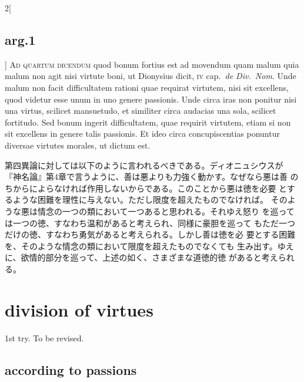 \documentclass[paper=a4paper,fontsize=10pt,jafontsize=9pt,titlepage]{jlreq}
\begin{document}
\begin{paracol}{2}[\subsection{arg.1}]
{\scshape Ad quartum dicendum} quod bonum fortius est ad movendum
 quam malum quia malum non agit nisi virtute boni, ut Dionysius dicit,
 {\scshape iv} cap.~{\itshape de Div.~Nom}. Unde malum non facit
 difficultatem rationi quae requirat virtutem, nisi sit excellens,
 quod videtur esse unum in uno genere passionis. Unde circa iras non
 ponitur nisi una virtus, scilicet mansuetudo, et similiter circa
 audacias una sola, scilicet fortitudo. Sed bonum ingerit
 difficultatem, quae requirit virtutem, etiam si non sit excellens in
 genere talis passionis. Et ideo circa concupiscentias ponuntur
 diversae virtutes morales, ut dictum est.

\switchcolumn

第四異論に対しては以下のように言われるべきである。ディオニュシウスが
 『神名論』第4章で言うように、善は悪よりも力強く動かす。なぜなら悪は善
 のちからによらなければ作用しないからである。このことから悪は徳を必要
 とするような困難を理性に与えない。ただし限度を超えたものでなければ。
 そのような悪は情念の一つの類において一つあると思われる。それゆえ怒り
 を巡っては一つの徳、すなわち温和があると考えられ、同様に豪胆を巡って
 もただ一つだけの徳、すなわち勇気があると考えられる。しかし善は徳を必
 要とする困難を、そのような情念の類において限度を超えたものでなくても
 生み出す。ゆえに、欲情的部分を巡って、上述の如く、さまざまな道徳的徳
 があると考えられる。

\end{paracol}


\newpage

\section{division of virtues}
1st try. To be revised.
\subsection{according to passions}
\schema
{}
{
    {}
    {
	\schema
	{}
	{}
    }
}

\vspace{2em}
\end{document}
